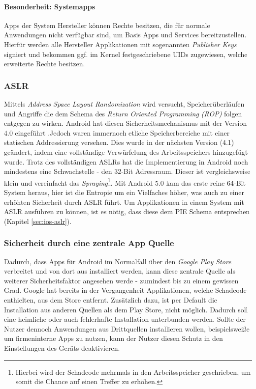 	\paragraph{Besonderheit: Systemapps}
	Apps der System Hersteller können Rechte besitzen, die für normale Anwendungen nicht verfügbar sind, um Basis Apps und Services bereitzustellen. Hierfür werden alle Hersteller Applikationen mit sogenannten \textit{Publisher Keys} signiert und bekommen ggf. im Kernel festgeschriebene UIDs zugewiesen, welche erweiterte Rechte besitzen.
	
	\subsubsection{ASLR}
	Mittels \textit{Address Space Layout Randomization} wird versucht, Speicherüberläufen und Angriffe die dem Schema des \textit{Return Oriented Programming (ROP)} folgen entgegen zu wirken. Android hat diesen Sicherheitsmechanismus mit der Version 4.0 eingeführt \cite{AslrAndroid}.Jedoch waren immernoch etliche Speicherbereiche mit einer statischen Addressierung versehen. Dies wurde in der nächsten Version (4.1) geändert, indem eine vollständige Verwürfelung des Arbeitsspeichers hinzugefügt wurde\cite{BetterAslrAndroid}. Trotz des vollständigen ASLRs hat die Implementierung in Android noch mindestens eine Schwachstelle - den 32-Bit Adressraum\cite{AslrAndroid32}. Dieser ist vergleichsweise klein und vereinfacht das \textit{Spraying}\footnote{Hierbei wird der Schadcode mehrmals in den Arbeitsspeicher geschrieben, um somit die Chance auf einen Treffer zu erhöhen.}. Mit Android 5.0 kam das erste reine 64-Bit System heraus, hier ist die Entropie um ein Vielfaches höher, was auch zu einer erhöhten Sicherheit durch ASLR führt. Um Applikationen in einem System mit ASLR ausführen zu können, ist es nötig, dass diese dem PIE Schema entsprechen (Kapitel \ref{sec:ios-aslr}).
	
	
	\subsubsection{Sicherheit durch eine zentrale App Quelle}
	Dadurch, dass Apps für Android im Normalfall über den \textit{Google Play Store} verbreitet und von dort aus installiert werden, kann diese zentrale Quelle als weiterer Sicherheitsfaktor angesehen werde - zumindest bis zu einem gewissen Grad. Google hat bereits in der Vergangenheit Applikationen, welche Schadcode enthielten, aus dem Store entfernt. Zusätzlich dazu, ist per Default die Installation aus anderen Quellen als dem Play Store, nicht möglich. Dadurch soll eine heimliche oder auch fehlerhafte Installation unterbunden werden. Sollte der Nutzer dennoch Anwendungen aus Drittquellen installieren wollen, beispielsweiße um firmeninterne Apps zu nutzen, kann der Nutzer diesen Schutz in den Einstellungen des Geräts deaktivieren.
